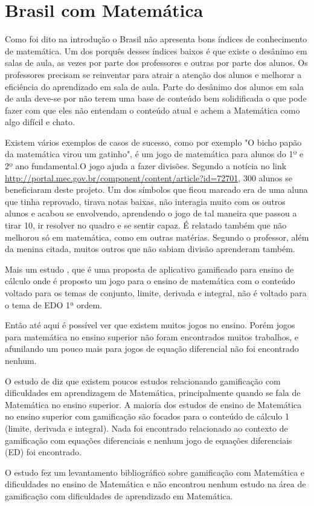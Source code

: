 
\section[Brasil com Matemática]{Brasil com Matemática}

Como foi dito na introdução o Brasil não apresenta bons índices de conhecimento de matemática. Um dos porquês desses índices baixos é que existe o desânimo em salas de aula, as vezes por parte dos professores e outras por parte dos alunos. Os professores precisam se reinventar para atrair a atenção dos alunos e melhorar a eficiência do aprendizado em sala de aula. Parte do desânimo dos alunos em sala de aula deve-se por não terem uma base de conteúdo bem solidificada o que pode fazer com que eles não entendam o conteúdo atual e achem a Matemática como algo difícil e chato.

Existem vários exemplos de casos de sucesso, como por exemplo "O bicho papão da matemática virou um gatinho", é um jogo de matemática para alunos do 1º e 2º ano fundamental.O jogo ajuda a fazer divisões. Segundo a notícia no link \url{http://portal.mec.gov.br/component/content/article?id=72701}, 300 alunos se beneficiaram deste projeto. Um dos símbolos que ficou marcado era de uma aluna que tinha reprovado, tirava notas baixas, não interagia muito com os outros alunos e acabou se envolvendo, aprendendo o jogo de tal maneira que passou a tirar 10, ir resolver no quadro e se sentir capaz. É relatado também que não melhorou só em matemática, como em outras matérias. Segundo o professor, além da menina citada, muitos outros que não sabiam divisão aprenderam também.

Mais um estudo \cite{appcalculo}, que é uma proposta de aplicativo gamificado para ensino de cálculo onde é proposto um jogo para o ensino de matemática com o conteúdo voltado para os temas de  conjunto, limite, derivada e integral, não é voltado para o tema de EDO 1ª ordem.

Então até aqui é possível ver que existem muitos jogos no ensino. Porém jogos para matemática no ensino superior não foram encontrados muitos trabalhos, e afunilando um pouco mais para jogos de equação diferencial não foi encontrado nenhum.


O estudo de \cite{revbibmatgam} diz que existem poucos estudos relacionando gamificação com dificuldades em aprendizagem de Matemática, principalmente quando se fala de Matemática no ensino superior. A maioria dos estudos de ensino de Matemática no ensino superior com gamificação são focados para o conteúdo de cálculo 1 (limite, derivada e integral). Nada foi encontrado relacionado ao contexto de gamificação com equações diferenciais e nenhum jogo de equações diferenciais (ED) foi encontrado.

O estudo \cite{revbibmatgam} fez um levantamento bibliográfico sobre gamificação com Matemática e dificuldades no ensino de Matemática e não encontrou nenhum estudo na área de gamificação com dificuldades de aprendizado em Matemática. 
